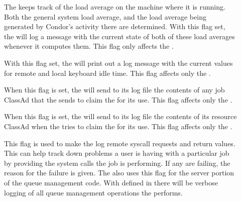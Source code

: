 \begin{description}
\begin{description}
  \item[] \label{dflag:load}
    The  keeps track
    of the load average on the machine where it is running.  Both the
    general system load average, and the load average being generated by
    Condor's activity there are determined.
    With this flag set, the 
    will log a message with the current state of both of these
    load averages whenever it computes them.  This flag only affects the
    .

  \item[] \label{dflag:keyboard} 
    With this flag set, the  will print out a log message
    with the current values for remote and local keyboard idle time.
    This flag affects only the .

  \item[] \label{dflag:job}
    When this flag is set, the
     will send to its log file the contents of any
    job ClassAd that the  sends to claim the
     for its use.  This flag affects only the
    .
    
  \item[] \label{dflag:machine}
    When this flag is set,
    the  will send to its log file the contents of
    its resource ClassAd when the  tries to claim the
     for its use.  This flag affects only the
    .

  \item[] \label{dflag:syscalls}
    This flag is used to
    make the  log remote syscall requests and return
    values.  This can help track down problems a user is having with a
    particular job by providing the system calls the job is
    performing. If any are failing, the reason for the
    failure is given.  The  also uses this flag for the server
    portion of the queue management code.  With 
    defined in  there will be verbose logging of all
    queue management operations the  performs.  


\end{description}
\end{description}
